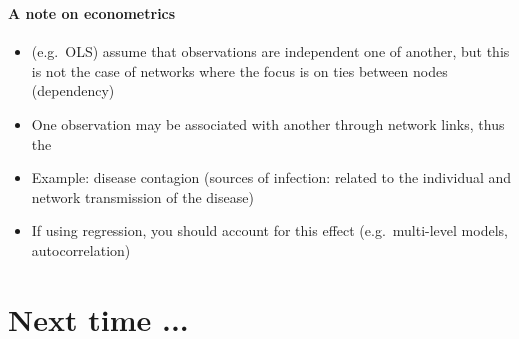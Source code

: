 \documentclass[8pt]{beamer}
\begin{document}

\begin{frame}
\frametitle{\insertsection}
\framesubtitle{A note on econometrics}

\begin{itemize}
\item {\color{blue}{Standard statistical approaches}} (e.g.\ OLS) assume that observations are independent one of another, but this is not the case of networks where the focus is on ties between nodes (dependency) \cite{Robins2012, Snijders2011}
\medskip
\medskip
\item One observation may be associated with another through network links, thus the {\color{blue}{errors are correlated with each other}}
\medskip
\medskip
\item Example: disease contagion (sources of infection: related to the individual and network transmission of the disease)
\medskip
\medskip
\item If using regression, you should account for this effect (e.g.\ multi-level models, autocorrelation)
\end{itemize}

\end{frame}








\bgroup
{}
\begin{frame}[plain]{}
\begin{center}
\color{white}{\Huge Questions}
\end{center}
\end{frame}
\egroup






\section*{Next time ...}

\bgroup
{}
\begin{frame}[plain]{}
\begin{center}
\color{white}{\Huge\insertsection}
\end{center}
\end{frame}
\egroup
\end{document}

